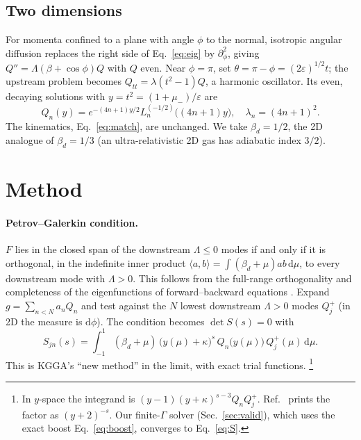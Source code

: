 \documentclass[aps,prd,twocolumn,superscriptaddress,nofootinbib,floatfix]{revtex4-2}
\newcommand{\bd}{\beta_d}
\newcommand{\dd}{\mathrm{d}}
\begin{document}
\subsection{Two dimensions}

For momenta confined to a plane with angle $\phi$ to the normal, isotropic angular diffusion replaces the right
side of Eq.~\eqref{eq:eig} by $\partial_\phi^2$, giving $Q''=\Lambda(\beta+\cos\phi)Q$ with $Q$ even. Near
$\phi=\pi$, set $\theta=\pi-\phi=(2\varepsilon)^{1/2}t$; the upstream problem becomes $Q_{tt}=\lambda(t^2-1)Q$,
a harmonic oscillator. Its even, decaying solutions with $y=t^2=(1+\mu_-)/\varepsilon$ are
\begin{equation}
Q_n(y)=e^{-(4n+1)y/2}L_n^{(-1/2)}\bigl((4n+1)y\bigr),\quad \lambda_n=(4n+1)^2 .
\end{equation}
The kinematics, Eq.~\eqref{eq:match}, are unchanged. We take $\bd=1/2$, the 2D analogue of $\bd=1/3$ (an
ultra-relativistic 2D gas has adiabatic index $3/2$).

\section{Method}
\label{sec:method}

\paragraph{Petrov--Galerkin condition.}
$F$ lies in the closed span of the downstream $\Lambda\le0$ modes if and only if it is orthogonal, in the
indefinite inner product $\langle a,b\rangle=\int(\bd+\mu)ab\,\dd\mu$, to every downstream mode with $\Lambda>0$.
This follows from the full-range orthogonality and completeness of the eigenfunctions of forward--backward
equations \cite{Beals1981,KGGA2000}. Expand $g=\sum_{n<N}a_nQ_n$ and test against the $N$ lowest downstream
$\Lambda>0$ modes $Q^+_j$ (in 2D the measure is $\dd\phi$). The condition becomes $\det S(s)=0$ with
\begin{equation}
S_{jn}(s)=\int_{-1}^{1}(\bd+\mu)\,\bigl(y(\mu)+\kappa\bigr)^s\,Q_n\bigl(y(\mu)\bigr)\,Q_j^+(\mu)\,\dd\mu .
\label{eq:S}
\end{equation}
This is KGGA's ``new method'' \cite{KGGA2000} in the limit, with exact trial functions.
\footnote{In $y$-space the integrand is $(y-1)(y+\kappa)^{s-3}Q_nQ_j^+$. Ref.~\cite{KGGA2000} prints the
factor as $(y+2)^{-s}$. Our finite-$\Gamma$ solver (Sec.~\ref{sec:valid}), which uses the exact boost
Eq.~\eqref{eq:boost}, converges to Eq.~\eqref{eq:S}.}
\end{document}
